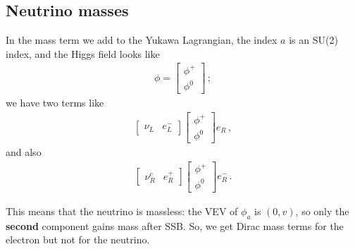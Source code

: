 \documentclass[main.tex]{subfiles}
\begin{document}
\subsection{Neutrino masses}



In the mass term we add to the Yukawa Lagrangian,
the index \(a\) is an SU(2) index, and the Higgs field looks like 
%
\begin{subequations}
\begin{align}
\phi = \left[\begin{array}{c}
\phi^{+} \\ 
\phi^{0}
\end{array}\right]
\,;
\end{align}
\end{subequations}
%
we have two terms like 
%
\begin{subequations}
\begin{align}
\left[\begin{array}{cc}
\nu_{L} & e^{-}_{L}
\end{array}\right]
\left[\begin{array}{c}
\phi^{+} \\ 
\phi^{0}
\end{array}\right]
e_{R}
\,,
\end{align}
\end{subequations}
%
and also 
%
\begin{subequations}
\begin{align}
\left[\begin{array}{cc}
\nu_{R}^{c} & e^{+}_{R}
\end{array}\right]
\left[\begin{array}{c}
\phi^{+} \\ 
\phi^{0}
\end{array}\right]
e_{R}^{-}
\,.
\end{align}
\end{subequations}

This means that the neutrino is massless: the VEV of \(\phi_{a}\) is \((0, v)\), so only the \textbf{second} component gains mass after SSB.
So, we get Dirac mass terms for the electron but not for the neutrino.
\end{document}

